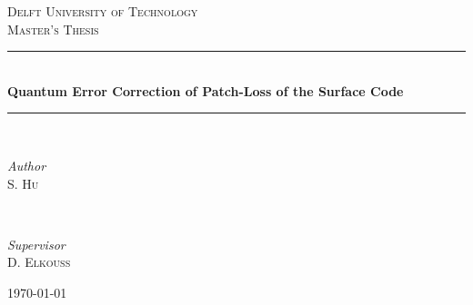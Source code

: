 \begin{titlepage}
	\newcommand{\HRule}{\rule{\linewidth}{0.3mm}}
	\center

	\textsc{\Large Delft University of Technology}\\[1.5cm]

	\textsc{\large Master's Thesis}\\[0.5cm]

    \vfill

	\HRule\\[1cm]

	{\huge\bfseries Quantum Error Correction of Patch-Loss of the Surface Code}\\[0.4cm]

	\HRule\\[1.8cm]

	\begin{minipage}{0.4\textwidth}
		\begin{flushleft}
			\large
			\textit{Author}\\
			S. \textsc{Hu}
		\end{flushleft}
	\end{minipage}
	~
	\begin{minipage}{0.4\textwidth}
		\begin{flushright}
			\large
			\textit{Supervisor}\\
			D. \textsc{Elkouss} %
		\end{flushright}
	\end{minipage}



	\vfill\vfill\vfill %

	{\large\today} %
	\vfill %

\end{titlepage}
